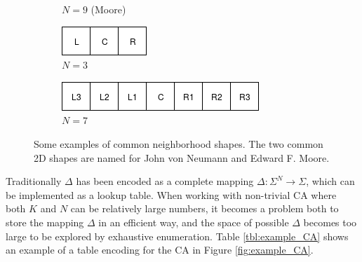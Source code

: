 \begin{figure}
\begin{subfigure}[t]{.175\columnwidth}
\caption{$N=9$ (Moore)}
\end{subfigure}\hfill%
\begin{subfigure}[t]{.175\columnwidth}
\centering
\includegraphics[width=\columnwidth]{fig/LCR}
\caption{$N=3$}
\end{subfigure}\hfill%
\begin{subfigure}[t]{.40\columnwidth}
\centering
\includegraphics[width=\columnwidth]{fig/LLLCRRR}
\caption{$N=7$}
\end{subfigure}\hfill%

\caption[Some CA neighborhoods]{Some examples of common neighborhood shapes. The two common 2D shapes are named for John von Neumann and Edward F. Moore.
}
\label{fig:neighborhoods}
\end{figure}

Traditionally $\Delta$ has been encoded as a complete mapping $\Delta: \Sigma^N \rightarrow \Sigma$, which can be implemented as a lookup table.
When working with non-trivial CA where both $K$ and $N$ can be relatively large numbers,
it becomes a problem both to store the mapping $\Delta$ in an efficient way,
and the space of possible $\Delta$ becomes too large to be explored by exhaustive enumeration.
Table \ref{tbl:example_CA} shows an example of a table encoding for the CA in Figure \ref{fig:example_CA}.

